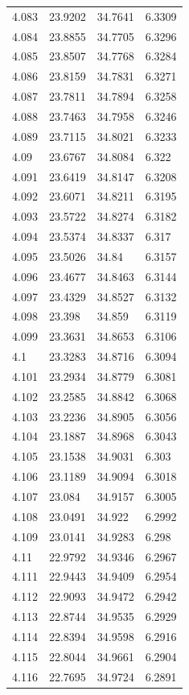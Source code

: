 \begin{tabular}{llll}
4.083 & 23.9202 & 34.7641 & 6.3309 \\
4.084 & 23.8855 & 34.7705 & 6.3296 \\
4.085 & 23.8507 & 34.7768 & 6.3284 \\
4.086 & 23.8159 & 34.7831 & 6.3271 \\
4.087 & 23.7811 & 34.7894 & 6.3258 \\
4.088 & 23.7463 & 34.7958 & 6.3246 \\
4.089 & 23.7115 & 34.8021 & 6.3233 \\
4.09 & 23.6767 & 34.8084 & 6.322 \\
4.091 & 23.6419 & 34.8147 & 6.3208 \\
4.092 & 23.6071 & 34.8211 & 6.3195 \\
4.093 & 23.5722 & 34.8274 & 6.3182 \\
4.094 & 23.5374 & 34.8337 & 6.317 \\
4.095 & 23.5026 & 34.84 & 6.3157 \\
4.096 & 23.4677 & 34.8463 & 6.3144 \\
4.097 & 23.4329 & 34.8527 & 6.3132 \\
4.098 & 23.398 & 34.859 & 6.3119 \\
4.099 & 23.3631 & 34.8653 & 6.3106 \\
4.1 & 23.3283 & 34.8716 & 6.3094 \\
4.101 & 23.2934 & 34.8779 & 6.3081 \\
4.102 & 23.2585 & 34.8842 & 6.3068 \\
4.103 & 23.2236 & 34.8905 & 6.3056 \\
4.104 & 23.1887 & 34.8968 & 6.3043 \\
4.105 & 23.1538 & 34.9031 & 6.303 \\
4.106 & 23.1189 & 34.9094 & 6.3018 \\
4.107 & 23.084 & 34.9157 & 6.3005 \\
4.108 & 23.0491 & 34.922 & 6.2992 \\
4.109 & 23.0141 & 34.9283 & 6.298 \\
4.11 & 22.9792 & 34.9346 & 6.2967 \\
4.111 & 22.9443 & 34.9409 & 6.2954 \\
4.112 & 22.9093 & 34.9472 & 6.2942 \\
4.113 & 22.8744 & 34.9535 & 6.2929 \\
4.114 & 22.8394 & 34.9598 & 6.2916 \\
4.115 & 22.8044 & 34.9661 & 6.2904 \\
4.116 & 22.7695 & 34.9724 & 6.2891 \\

\end{tabular}
